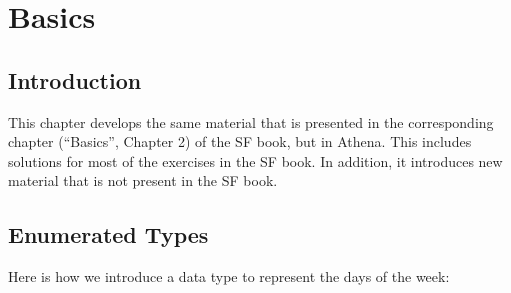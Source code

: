 \chapter{Basics} 


\section{Introduction}

This chapter develops the same material that is presented in the corresponding chapter (``Basics'', Chapter 2) of the SF book,
but in Athena. This includes solutions for most of the exercises in the SF book. In addition, it introduces new material
that is not present in the SF book. 

\section{Enumerated Types}

Here is how we introduce a data type to represent the days of the week: 

